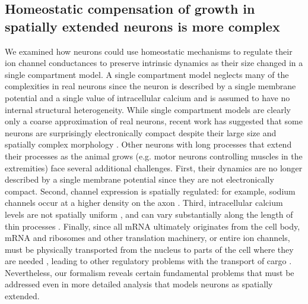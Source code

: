 \documentclass[9pt,lineno]{elife}
\begin{document}
\subsection{Homeostatic compensation of growth in spatially extended neurons is more complex}

We examined how neurons could use homeostatic mechanisms to regulate their ion channel conductances to preserve intrinsic dynamics as their size changed in a single compartment model. A single compartment model neglects many of the complexities in real neurons since the neuron is described by a single membrane potential and a single value of intracellular calcium and is assumed to have no internal structural heterogeneity. While single compartment models are clearly only a coarse approximation of real neurons, recent work has suggested that some neurons are surprisingly electronically compact despite their large size and spatially complex morphology \citep{Otopalik:2017jr, Ray:2019fo}. Other neurons with long processes that extend their processes as the animal grows (e.g. motor neurons controlling muscles in the extremities) face several additional challenges. First, their dynamics are no longer described by a single membrane potential since they are not electronically compact. Second, channel expression is spatially regulated: for example, sodium channels occur at a higher density on the axon \citep{Kole:2008jv}. Third, intracellular calcium levels are not spatially uniform \citep{HernandezCruz:1990wv}, and can vary substantially along the length of thin processes \citep{Regehr:1994wg}. Finally, since all mRNA ultimately originates from the cell body, mRNA and ribosomes and other translation machinery, or entire ion channels, must be physically transported from the nucleus to parts of the cell where they are needed \citep{Doyle:2011be, Kosik:2016gs, Bramham:2007ii}, leading to other regulatory problems with the transport of cargo \citep{Doyle:2011be,Williams:2016cw}. Nevertheless, our formalism reveals certain fundamental problems that must be addressed even in more detailed analysis that models neurons as spatially extended.  
\end{document}
